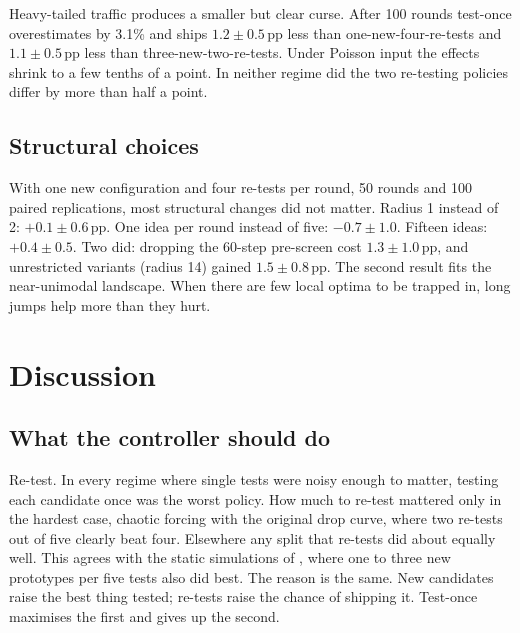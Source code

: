 \documentclass[11pt,a4paper]{article}
\newcommand{\pp}{\,\text{pp}}
\begin{document}
Heavy-tailed traffic produces a smaller but clear curse. After 100 rounds test-once overestimates by 3.1\% and ships $1.2\pm0.5\pp$ less than one-new-four-re-tests and $1.1\pm0.5\pp$ less than three-new-two-re-tests. Under Poisson input the effects shrink to a few tenths of a point. In neither regime did the two re-testing policies differ by more than half a point.

\subsection{Structural choices}
\label{sec:ablate}

With one new configuration and four re-tests per round, 50 rounds and 100 paired replications, most structural changes did not matter. Radius 1 instead of 2: $+0.1\pm0.6\pp$. One idea per round instead of five: $-0.7\pm1.0$. Fifteen ideas: $+0.4\pm0.5$. Two did: dropping the 60-step pre-screen cost $1.3\pm1.0\pp$, and unrestricted variants (radius 14) gained $1.5\pm0.8\pp$. The second result fits the near-unimodal landscape. When there are few local optima to be trapped in, long jumps help more than they hurt.

\section{Discussion}
\label{sec:discussion}

\subsection{What the controller should do}
Re-test. In every regime where single tests were noisy enough to matter, testing each candidate once was the worst policy. How much to re-test mattered only in the hardest case, chaotic forcing with the original drop curve, where two re-tests out of five clearly beat four. Elsewhere any split that re-tests did about equally well. This agrees with the static simulations of \citet{kuras2026when}, where one to three new prototypes per five tests also did best. The reason is the same. New candidates raise the best thing tested; re-tests raise the chance of shipping it. Test-once maximises the first and gives up the second.
\end{document}
